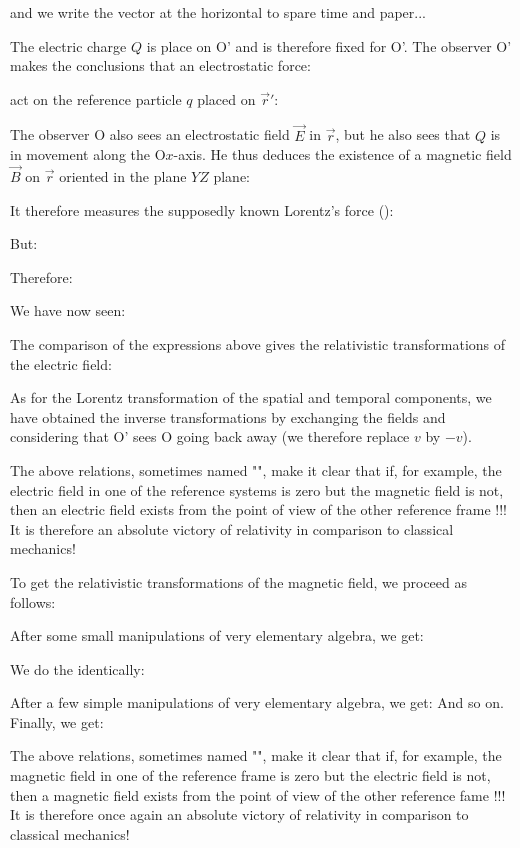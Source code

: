 	and we write the vector at the horizontal to spare time and paper...

	The electric charge $Q$ is place on O' and is therefore fixed for O'. The observer O' makes the conclusions that an electrostatic force:
	
	act on the reference particle $q$ placed on $\vec{r}'$:
	
	The observer O also sees an electrostatic field $\vec{E}$ in $\vec{r}$, but he also sees that $Q$ is in movement along the O$x$-axis. He thus deduces the existence of a magnetic field $\vec{B}$ on $\vec{r}$ oriented in the plane $YZ$ plane:
	
	It therefore measures the supposedly known Lorentz's force ():
	
	But:
	
	Therefore:
	
	We have now seen:
	
	The comparison of the expressions above gives the relativistic transformations of the electric field:
	
	As for the Lorentz transformation of the spatial and temporal components, we have obtained the inverse transformations by exchanging the fields and considering that O' sees O going back away (we therefore replace $v$ by $-v$).

	The above relations, sometimes named "", make it clear that if, for example, the electric field in one of the reference systems is zero but the magnetic field is not, then an electric field exists from the point of view of the other reference frame !!! It is therefore an absolute victory of relativity in comparison to classical mechanics!

	To get the relativistic transformations of the magnetic field, we proceed as follows:
	
	After some small manipulations of very elementary algebra, we get:
	
	We do the identically:
	
	After a few simple manipulations of very elementary algebra, we get:
	And so on. Finally, we get:
	
	The above relations, sometimes named "", make it clear that if, for example, the magnetic field in one of the reference frame is zero but the electric field is not, then a magnetic field exists from the point of view of the other reference fame !!! It is therefore once again an absolute victory of relativity in comparison to classical mechanics!

